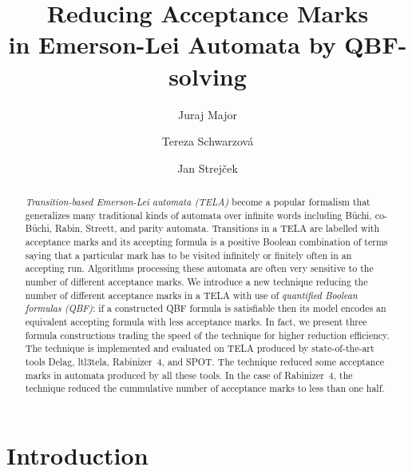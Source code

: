 \documentclass[runningheads]{llncs}
\begin{document}

\title{Reducing Acceptance Marks\\ in Emerson-Lei Automata by QBF-solving}
 \author{Juraj Major \and Tereza Schwarzová \and Jan Strej\v{c}ek}


\maketitle


\begin{abstract}
  \emph{Transition-based Emerson-Lei automata (TELA)} become a popular
  formalism that generalizes many traditional kinds of automata over
  infinite words including Büchi, co-Büchi, Rabin, Streett, and parity
  automata. Transitions in a TELA are labelled with acceptance marks
  and its accepting formula is a positive Boolean combination of terms
  saying that a particular mark has to be visited infinitely or
  finitely often in an accepting run. Algorithms processing these
  automata are often very sensitive to the number of different
  acceptance marks. We introduce a new technique reducing the number
  of different acceptance marks in a TELA with use of \emph{quantified
    Boolean formulas (QBF)}: if a constructed QBF formula is
  satisfiable then its model encodes an equivalent accepting formula
  with less acceptance marks. In fact, we present three formula
  constructions trading the speed of the technique for higher
  reduction efficiency. The technique is implemented and evaluated on
  TELA produced by state-of-the-art tools Delag, ltl3tela,
  Rabinizer~4, and SPOT. The technique reduced some acceptance marks
  in automata produced by all these tools. In the case of Rabinizer~4,
  the technique reduced the cummulative number of acceptance marks to
  less than one half. 
\end{abstract}



\section{Introduction}
\end{document}

